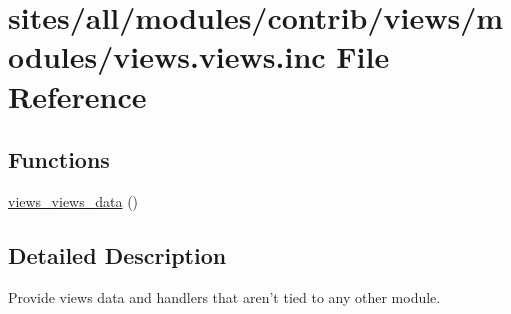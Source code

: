 \hypertarget{views_8views_8inc}{
\section{sites/all/modules/contrib/views/modules/views.views.inc File Reference}
\label{views_8views_8inc}
}
\subsection*{Functions}
\begin{CompactItemize}
\item 
\hyperlink{group__views__views__module_g7cb75f664d834d02d298626b158c2b75}{views\_\-views\_\-data} ()
\end{CompactItemize}


\subsection{Detailed Description}
Provide views data and handlers that aren't tied to any other module. 